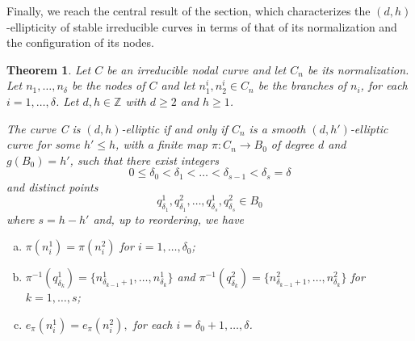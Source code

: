 \documentclass{article}
\newtheorem{theorem}{Theorem}
\renewcommand{\:}{\colon }
\begin{document}
Finally, we reach the central result of the section, which characterizes the $(d, h)$-ellipticity of stable irreducible curves in terms of that of its normalization and the configuration of its nodes.

\begin{theorem}\label{thm:main}
Let $C$ be an irreducible nodal curve and let $C_n$ be its normalization. 
Let $n_1,\ldots,n_\delta$ be the nodes of $C$ and 
let $n_1^i,n_2^i\in C_n$ be the branches of $n_i$, 
for each $i=1,\ldots,\delta$. Let $d,h\in\mathbb Z$ with $d\geq 2$ and $h\geq 1$.
%
%


The curve C is $(d,h)$-elliptic if and only if $C_n$ is a smooth $(d,{h'})$-elliptic curve for some ${h'}\leq h$, with a finite map  $\pi:C_n\rightarrow B_0$ of degree $d$ and $g(B_0)={h}'$, 
such that
there exist  integers 
$$0\leq  \delta_0 < \delta_1 < \ldots < \delta_{s-1} < \delta_s = \delta$$
and distinct points 
$$q_{\delta_1}^1,q_{\delta_1}^2,\ldots, q_{\delta_s}^1,q_{\delta_s}^2\in B_0$$
where $s=h-h'$ and, up to reordering, we have 
\begin{enumerate}[(a)]
\item $\pi(n_i^1)=\pi(n_i^2)$ for $i=1,\ldots,\delta_0$;
\item  	$\pi^{-1}(q_{\delta_k}^1)= 
\{ n_{\delta_{k-1}+1}^1,\ldots, n_{\delta_k}^1 \}$
and 
$\pi^{-1}(q_{\delta_k}^2)=\{ n_{\delta_{k-1}+1}^2,\ldots, n_{\delta_k}^2 \}$
for $k=1,\ldots, s$;
\item $e_{\pi}(n_i^1)=e_{\pi}(n_i^2),$
for each $i=\delta_0+1,\ldots,\delta$.
\end{enumerate}

\end{theorem}
\end{document}
